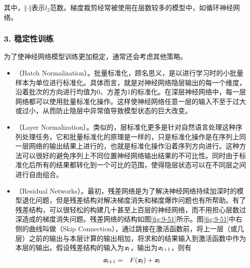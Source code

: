 \noindent 其中，$ \Vert \cdot \Vert $表示$ l_2 $范数。梯度裁剪经常被使用在层数较多的模型中，如循环神经网络。


\subsubsection{3. 稳定性训练}

\parinterval  为了使神经网络模型训练更加稳定，通常还会考虑其他策略。

\begin{itemize}
\item {\small{}}（Batch Normalization）。批量标准化，顾名思义，是以进行学习时的小批量样本为单位进行标准化。具体而言，就是对神经网络隐层输出的每一个维度，沿着批次的方向进行均值为0、方差为1的标准化。在深层神经网络中，每一层网络都可以使用批量标准化操作。这样使神经网络任意一层的输入不至于过大或过小，从而防止隐层中异常值导致模型状态的巨大改变。

\item {\small{}}（Layer Normalization）。类似的，层标准化更多是针对自然语言处理这种序列处理任务，它和批量标准化的原理是一样的，只是标准化操作是在序列上同一层网络的输出结果上进行的，也就是标准化操作沿着序列方向进行。这种方法可以很好的避免序列上不同位置神经网络输出结果的不可比性。同时由于标准化后所有的结果都转化到一个可比的范围，使得隐层状态可以在不同层之间进行自由组合。

\item {\small{}}（Residual Networks）。最初，残差网络是为了解决神经网络持续加深时的模型退化问题，但是残差结构对解决梯度消失和梯度爆炸问题也有所帮助。有了残差结构，可以很轻松的构建几十甚至上百层的神经网络，而不用担心层数过深造成的梯度消失问题。残差网络的结构如图\ref{fig:9-51}所示。图\ref{fig:9-51}中右侧的曲线叫做{\small{}}（Skip Connection），通过跳接在激活函数前，将上一层（或几层）之前的输出与本层计算的输出相加，将求和的结果输入到激活函数中作为本层的输出。假设残差结构的输入为$ {\textbf{\em x}}_l $，输出为$ {\textbf{\em x}}_{l+1} $，则有
\begin{eqnarray}
{\textbf{\em x}}_{l+1}&=&F({\textbf{\em x}}_l)+{\textbf{\em x}}_l
\label{eq:9-44}
\end{eqnarray}


\end{itemize}
